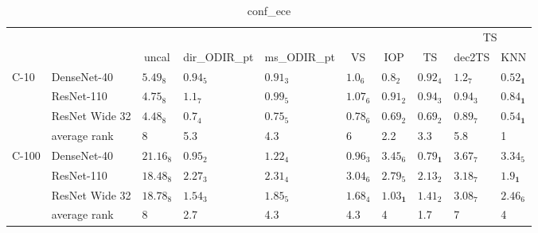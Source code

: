 \begin{table*}
\caption{conf_ece}
\label{table:conf_ece}
\centering
\begin{adjustbox}{width=\textwidth}

\begin{tabular}{llllllllll}
\toprule
\multicolumn{8}{c}{}&\multicolumn{2}{c}{TS}\\
\cmidrule{9-10}
\multicolumn{1}{c}{}&\multicolumn{1}{c}{}&\multicolumn{1}{c}{uncal}&\multicolumn{1}{c}{dir_ODIR_pt}&\multicolumn{1}{c}{ms_ODIR_pt}&\multicolumn{1}{c}{VS}&\multicolumn{1}{c}{IOP}&\multicolumn{1}{c}{TS}&\multicolumn{1}{c}{dec2TS}&\multicolumn{1}{c}{KNN}\\\midrule
C-10 & DenseNet-40 &   $5.49_{8}$ &  $0.94_{5}$ &  $0.91_{3}$ &   $1.0_{6}$ &            $0.8_{2}$ &           $0.92_{4}$ &   $1.2_{7}$ &  $\mathbf{0.52_{1}}$ \\
      & ResNet-110 &   $4.75_{8}$ &   $1.1_{7}$ &  $0.99_{5}$ &  $1.07_{6}$ &           $0.91_{2}$ &           $0.94_{3}$ &  $0.94_{3}$ &  $\mathbf{0.84_{1}}$ \\
      & ResNet Wide 32 &   $4.48_{8}$ &   $0.7_{4}$ &  $0.75_{5}$ &  $0.78_{6}$ &           $0.69_{2}$ &           $0.69_{2}$ &  $0.89_{7}$ &  $\mathbf{0.54_{1}}$ \\
\cmidrule{2-10}
      & average rank &            8 &         5.3 &         4.3 &           6 &                  2.2 &                  3.3 &         5.8 &                    1 \\
\cmidrule{1-10}
C-100 & DenseNet-40 &  $21.16_{8}$ &  $0.95_{2}$ &  $1.22_{4}$ &  $0.96_{3}$ &           $3.45_{6}$ &  $\mathbf{0.79_{1}}$ &  $3.67_{7}$ &           $3.34_{5}$ \\
      & ResNet-110 &  $18.48_{8}$ &  $2.27_{3}$ &  $2.31_{4}$ &  $3.04_{6}$ &           $2.79_{5}$ &           $2.13_{2}$ &  $3.18_{7}$ &   $\mathbf{1.9_{1}}$ \\
      & ResNet Wide 32 &  $18.78_{8}$ &  $1.54_{3}$ &  $1.85_{5}$ &  $1.68_{4}$ &  $\mathbf{1.03_{1}}$ &           $1.41_{2}$ &  $3.08_{7}$ &           $2.46_{6}$ \\
\cmidrule{2-10}
      & average rank &            8 &         2.7 &         4.3 &         4.3 &                    4 &                  1.7 &           7 &                    4 \\
\bottomrule
\end{tabular}


\end{adjustbox}
\end{table*}